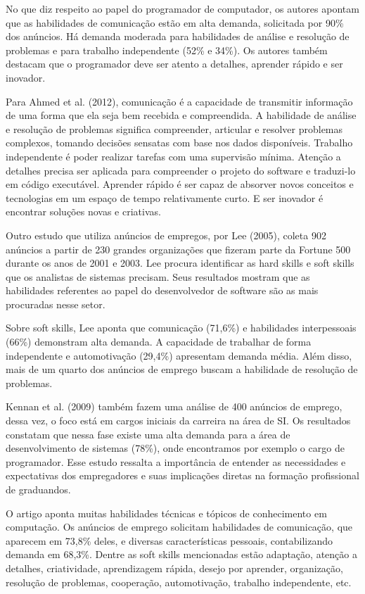 No que diz respeito ao papel do programador de computador, os autores apontam que as habilidades de comunicação estão em alta demanda, solicitada por 90\% dos anúncios. Há demanda moderada para habilidades de análise e resolução de problemas e para trabalho independente (52\% e 34\%). Os autores também destacam que o programador deve ser atento a detalhes, aprender rápido e ser inovador.

Para Ahmed et al. (2012)\nocite{ahmed:12}, comunicação é a capacidade de transmitir informação de uma forma que ela seja bem recebida e compreendida. A habilidade de análise e resolução de problemas significa compreender, articular e resolver problemas complexos, tomando decisões sensatas com base nos dados disponíveis. Trabalho independente é poder realizar tarefas com uma supervisão mínima. Atenção a detalhes precisa ser aplicada para compreender o projeto do software e traduzi-lo em código executável. Aprender rápido é ser capaz de absorver novos conceitos e tecnologias em um espaço de tempo relativamente curto. E ser inovador é encontrar soluções novas e criativas.

Outro estudo que utiliza anúncios de empregos, por Lee (2005)\nocite{lee:05}, coleta 902 anúncios a partir de 230 grandes organizações que fizeram parte da Fortune 500 durante os anos de 2001 e 2003. Lee procura identificar as hard skills e soft skills que os analistas de sistemas precisam. Seus resultados mostram que as habilidades referentes ao papel do desenvolvedor de software são as mais procuradas nesse setor.

Sobre soft skills, Lee aponta que comunicação (71,6\%) e habilidades interpessoais (66\%) demonstram alta demanda.
A capacidade de trabalhar de forma independente e automotivação (29,4\%) apresentam demanda média.
Além disso, mais de um quarto dos anúncios de emprego buscam a habilidade de resolução de problemas.

Kennan et al. (2009)\nocite{kennan:09} também fazem uma análise de 400 anúncios de emprego, dessa vez, o foco está em cargos iniciais da carreira na área de SI. Os resultados constatam que nessa fase existe uma alta demanda para a área de desenvolvimento de sistemas (78\%), onde encontramos por exemplo o cargo de programador. Esse estudo ressalta a importância de entender as necessidades e expectativas dos empregadores e suas implicações diretas na formação profissional de graduandos.

O artigo aponta muitas habilidades técnicas e tópicos de conhecimento em computação. Os anúncios de emprego solicitam habilidades de comunicação, que aparecem em 73,8\% deles, e diversas características pessoais, contabilizando demanda em 68,3\%. Dentre as soft skills mencionadas estão adaptação, atenção a detalhes, criatividade, aprendizagem rápida, desejo por aprender, organização, resolução de problemas, cooperação, automotivação, trabalho independente, etc. 

